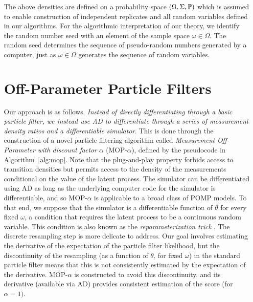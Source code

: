 \documentclass[9pt,twocolumn,pnasresearcharticle]{pnas-new}
\newcommand\arxiv[2]{#2} %
\begin{document}
The above densities are defined on a probability space $(\Omega, \Sigma, \mathbb{P})$ which is assumed to enable construction of independent replicates and all random variables defined in our algorithms.
For the algorithmic interpretation of our theory, we identify the random number seed with an element of the sample space $\omega \in \Omega$. The random seed determines the sequence of pseudo-random numbers generated by a computer, just as $\omega\in\Omega$ generates the sequence of random variables.


\arxiv{}{\vspace*{-2mm}}
\section{Off-Parameter Particle Filters}

Our approach is as follows. \textit{Instead of directly differentiating through a basic particle filter, we instead use AD to differentiate through a series of measurement density ratios and a differentiable simulator}. 
This is done through the construction of a novel particle filtering algorithm called {\it Measurement Off-Parameter with discount factor} $\alpha$ (MOP-$\alpha$), defined by the pseudocode in Algorithm~\ref{alg:mop}.
Note that the plug-and-play property forbids access to transition densities but permits access to the density of the measurements conditional on the value of the latent process.
The simulator can be differentiated using AD as long as the underlying computer code for the simulator is differentiable, and so MOP-$\alpha$ is applicable to a broad class of POMP models.
To that end, we suppose that the simulator is a differentiable function of $\theta$ for every fixed $\omega$, a condition that requires the latent process to be a continuous random variable. 
This condition is also known as the {\it reparameterization trick} \cite{corenflos21}.
The discrete resampling step is more delicate to address. 
Our goal involves estimating the derivative of the expectation of the particle filter likelihood, but the discontinuity of the resampling (as a function of $\theta$, for fixed $\omega$) in the standard particle filter means that this is not consistently estimated by the expectation of the derivative. 
MOP-$\alpha$ is constructed to avoid this discontinuity, and its derivative (available via AD) provides consistent estimation of the score (for $\alpha=1)$.
\end{document}
